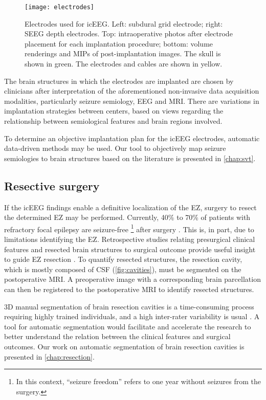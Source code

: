 \begin{figure}
  \centering
  \texttt{[image: electrodes]}
  \caption[Electrodes used for intracranial EEG]{
    Electrodes used for \ac{icEEG}.
    Left: subdural grid electrode;
    right: \ac{SEEG} depth electrodes.
    Top: intraoperative photos after electrode placement for each implantation procedure;
    bottom: volume renderings and \acp{MIP} of post-implantation images.
    The skull is shown in green. The electrodes and cables are shown in yellow.
  }\label{fig:electrodes}
\end{figure}

The brain structures in which the electrodes are implanted are chosen by clinicians after interpretation of the aforementioned non-invasive data acquisition modalities, particularly seizure semiology, \ac{EEG} and \ac{MRI}.
There are variations in implantation strategies between centers, based on views regarding the relationship between semiological features and brain regions involved.

To determine an objective implantation plan for the \ac{icEEG} electrodes, automatic data-driven methods may be used.
Our tool to objectively map seizure semiologies to brain structures based on the literature is presented in \cref{chap:svt}.


\subsection{Resective surgery}

If the \ac{icEEG} findings enable a definitive localization of the \ac{EZ}, surgery to resect the determined \ac{EZ} may be performed.
Currently, 40\% to 70\% of patients with refractory focal epilepsy are seizure-free%
\footnote{In this context, ``seizure freedom'' refers to one year without seizures from the surgery.}
after surgery \cite{jobst_resective_2015}.
This is, in part, due to limitations identifying the \ac{EZ}.
Retrospective studies relating presurgical clinical features and resected brain structures to surgical outcome provide useful insight to guide \ac{EZ} resection \cite{jobst_resective_2015}.
To quantify resected structures, the resection cavity, which is mostly composed of \ac{CSF} (\cref{fig:cavities}), must be segmented on the postoperative \ac{MRI}.
A preoperative image with a corresponding brain parcellation can then be registered to the postoperative \ac{MRI} to identify resected structures.

3D manual segmentation of brain resection cavities is a time-consuming process requiring highly trained individuals, and a high inter-rater variability is usual \cite{havaei_brain_2017}.
A tool for automatic segmentation would facilitate and accelerate the research to better understand the relation between the clinical features and surgical outcomes.
Our work on automatic segmentation of brain resection cavities is presented in \cref{chap:resection}.


